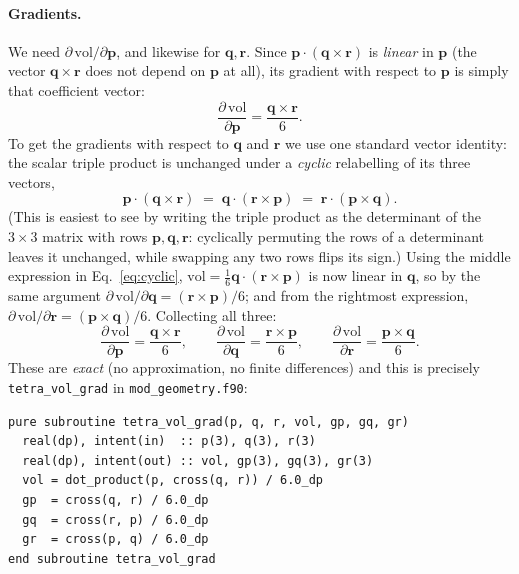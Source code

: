 \documentclass[11pt,a4paper]{report}
\newcommand{\rvec}{\mathbf{r}}
\newcommand{\pvec}{\mathbf{p}}
\newcommand{\qvec}{\mathbf{q}}
\begin{document}
\paragraph{Gradients.} We need
$\partial\,\mathrm{vol}/\partial\pvec$, and likewise for $\qvec,\rvec$.
Since $\pvec\cdot(\qvec\times\rvec)$ is \emph{linear} in $\pvec$ (the vector
$\qvec\times\rvec$ does not depend on $\pvec$ at all), its gradient with
respect to $\pvec$ is simply that coefficient vector:
\begin{equation}
  \frac{\partial\, \mathrm{vol}}{\partial \pvec} = \frac{\qvec\times\rvec}{6}.
\end{equation}
To get the gradients with respect to $\qvec$ and $\rvec$ we use one
standard vector identity: the scalar triple product is unchanged under
a \emph{cyclic} relabelling of its three vectors,
\begin{equation}
  \pvec\cdot(\qvec\times\rvec) \;=\; \qvec\cdot(\rvec\times\pvec) \;=\; \rvec\cdot(\pvec\times\qvec) .
  \label{eq:cyclic}
\end{equation}
(This is easiest to see by writing the triple product as the
determinant of the $3\times3$ matrix with rows $\pvec,\qvec,\rvec$: cyclically
permuting the rows of a determinant leaves it unchanged, while swapping
any two rows flips its sign.) Using the middle expression in
Eq.~\ref{eq:cyclic}, $\mathrm{vol}=\frac16\qvec\cdot(\rvec\times\pvec)$ is now
linear in $\qvec$, so by the same argument
$\partial\,\mathrm{vol}/\partial\qvec = (\rvec\times\pvec)/6$; and from the
rightmost expression, $\partial\,\mathrm{vol}/\partial\rvec=(\pvec\times\qvec)/6$.
Collecting all three:
\begin{equation}
  \frac{\partial\, \mathrm{vol}}{\partial \pvec} = \frac{\qvec\times\rvec}{6}, \qquad
  \frac{\partial\, \mathrm{vol}}{\partial \qvec} = \frac{\rvec\times\pvec}{6}, \qquad
  \frac{\partial\, \mathrm{vol}}{\partial \rvec} = \frac{\pvec\times\qvec}{6}.
  \label{eq:tetra-grad}
\end{equation}
These are \emph{exact} (no approximation, no finite differences) and
this is precisely \texttt{tetra\_vol\_grad} in \texttt{mod\_geometry.f90}:

\begin{lstlisting}
pure subroutine tetra_vol_grad(p, q, r, vol, gp, gq, gr)
  real(dp), intent(in)  :: p(3), q(3), r(3)
  real(dp), intent(out) :: vol, gp(3), gq(3), gr(3)
  vol = dot_product(p, cross(q, r)) / 6.0_dp
  gp  = cross(q, r) / 6.0_dp
  gq  = cross(r, p) / 6.0_dp
  gr  = cross(p, q) / 6.0_dp
end subroutine tetra_vol_grad
\end{lstlisting}
\end{document}
